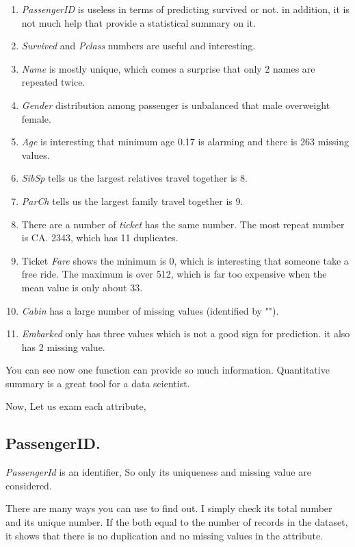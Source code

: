 \documentclass[
]{book}
\providecommand{\tightlist}{%
  \setlength{\itemsep}{0pt}\setlength{\parskip}{0pt}}
\begin{document}
\begin{enumerate}
\def\labelenumi{\arabic{enumi}.}
\tightlist
\item
  \emph{PassengerID} is useless in terms of predicting survived or not. in addition, it is not much help that provide a statistical summary on it.
\item
  \emph{Survived} and \emph{Pclass} numbers are useful and interesting.
\item
  \emph{Name} is mostly unique, which comes a surprise that only 2 names are repeated twice.
\item
  \emph{Gender} distribution among passenger is unbalanced that male overweight female.
\item
  \emph{Age} is interesting that minimum age 0.17 is alarming and there is 263 missing values.
\item
  \emph{SibSp} tells us the largest relatives travel together is 8.
\item
  \emph{ParCh} tells us the largest family travel together is 9.
\item
  There are a number of \emph{ticket} has the same number. The most repeat number is CA. 2343, which has 11 duplicates.
\item
  Ticket \emph{Fare} shows the minimum is 0, which is interesting that someone take a free ride. The maximum is over 512, which is far too expensive when the mean value is only about 33.
\item
  \emph{Cabin} has a large number of missing values (identified by "").
\item
  \emph{Embarked} only has three values which is not a good sign for prediction. it also has 2 missing value.
\end{enumerate}

You can see now one function can provide so much information. Quantitative summary is a great tool for a data scientist.

Now, Let us exam each attribute,

\hypertarget{passengerid.}{%
\subsection{PassengerID.}\label{passengerid.}}

\emph{PassengerId} is an identifier, So only its uniqueness and missing value are considered.

There are many ways you can use to find out. I simply check its total number and its unique number. If the both equal to the number of records in the dataset, it shows that there is no duplication and no missing values in the attribute.
\end{document}
